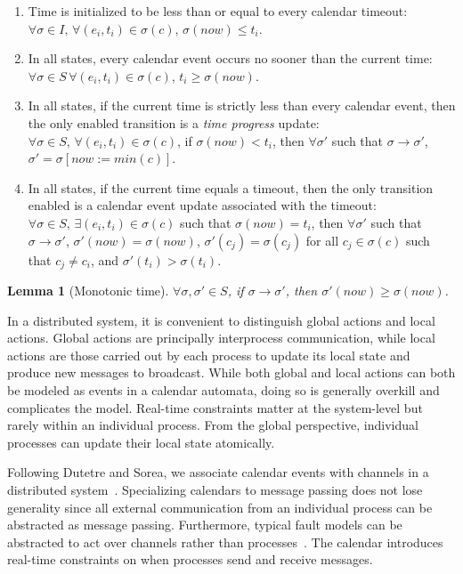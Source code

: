 \documentclass{IEEEtran/IEEEtran}
\newtheorem{lemma}{Lemma}
\begin{document}
\begin{enumerate}
\item Time is initialized to be less than or equal to every calendar timeout: $\forall \sigma \in I, \, \forall (e_i, t_i) \in \sigma(c)$, $\sigma(now) \leq t_i$.
\item In all states, every calendar event occurs no sooner than the current time: $\forall \sigma \in S \, \forall (e_i, t_i) \in \sigma(c)$, $t_i \geq \sigma(now)$.
\item In all states, if the current time is strictly less than every calendar event, then the only enabled transition is a \emph{time progress} update: $\forall \sigma \in S, \, \forall (e_i, t_i) \in \sigma(c)$, if $\sigma(now) < t_i$, then $\forall \sigma'$ such that $\sigma \rightarrow \sigma'$, $\sigma' = \sigma[now := min(c)]$.
\item In all states, if the current time equals a timeout, then the only transition enabled is a calendar event update associated with the timeout: $\forall \sigma \in S, \, \exists (e_i, t_i) \in \sigma(c)$ such that $\sigma(now) = t_i$, then $\forall \sigma'$ such that $\sigma \rightarrow \sigma'$, $\sigma'(now) = \sigma(now)$, $\sigma'(c_j) = \sigma(c_j)$ for all $c_j \in \sigma(c)$ such that $c_j \neq c_i$, and $\sigma'(t_i) > \sigma(t_i)$.
\end{enumerate}

\begin{lemma}[Monotonic time]
$\forall \sigma, \sigma' \in S$, if $\sigma \rightarrow \sigma'$, then $\sigma'(now) \geq \sigma(now)$.
\end{lemma}

In a distributed system, it is convenient to distinguish global actions and local actions. Global actions are principally interprocess communication, while local actions are those carried out by each process to update its local state and produce new messages to broadcast. While both global and local actions can both be modeled as events in a calendar automata, doing so is generally overkill and complicates the model. Real-time constraints matter at the system-level but rarely within an individual process. From the global perspective, individual processes can update their local state atomically.

Following Dutetre and Sorea, we associate calendar events with channels in a distributed system~\cite{dutetre}. Specializing calendars to message passing does not lose generality since all external communication from an individual process can be abstracted as message passing. Furthermore, typical fault models can be abstracted to act over channels rather than processes~\cite{abstractions}. The calendar introduces real-time constraints on when processes send and receive messages.
\end{document}
